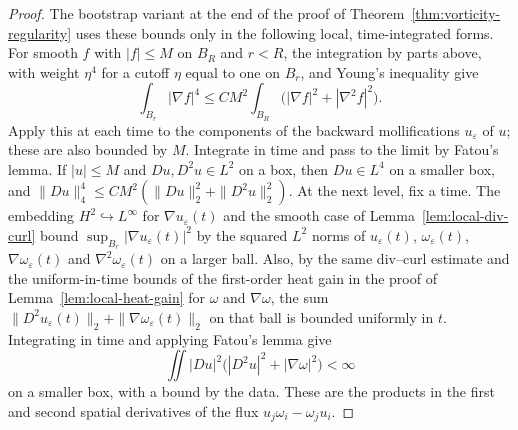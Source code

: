 \documentclass[11pt,letterpaper]{article}
\numberwithin{equation}{section}
\theoremstyle{plain}
\theoremstyle{definition}
\theoremstyle{remark}
\begin{document}
\begin{proof}
The bootstrap variant at the end of the proof of Theorem~\ref{thm:vorticity-regularity} uses these bounds only in the following local, time-integrated forms. For smooth $f$ with $|f|\le M$ on $B_R$ and $r<R$, the integration by parts above, with weight $\eta^4$ for a cutoff $\eta$ equal to one on $B_r$, and Young's inequality give
\[
 \int_{B_r}|\nabla f|^4\le CM^2\int_{B_R}\bigl(|\nabla f|^2+|\nabla^2f|^2\bigr).
\]
Apply this at each time to the components of the backward mollifications $u_\varepsilon$ of $u$; these are also bounded by $M$. Integrate in time and pass to the limit by Fatou's lemma. If $|u|\le M$ and $Du,D^2u\in L^2$ on a box, then $Du\in L^4$ on a smaller box, and $\|Du\|_4^4\le CM^2(\|Du\|_2^2+\|D^2u\|_2^2)$. At the next level, fix a time. The embedding $H^2\hookrightarrow L^\infty$ for $\nabla u_\varepsilon(t)$ and the smooth case of Lemma~\ref{lem:local-div-curl} bound $\sup_{B_r}|\nabla u_\varepsilon(t)|^2$ by the squared $L^2$ norms of $u_\varepsilon(t)$, $\omega_\varepsilon(t)$, $\nabla\omega_\varepsilon(t)$ and $\nabla^2\omega_\varepsilon(t)$ on a larger ball. Also, by the same div--curl estimate and the uniform-in-time bounds of the first-order heat gain in the proof of Lemma~\ref{lem:local-heat-gain} for $\omega$ and $\nabla\omega$, the sum $\|D^2u_\varepsilon(t)\|_2+\|\nabla\omega_\varepsilon(t)\|_2$ on that ball is bounded uniformly in $t$. Integrating in time and applying Fatou's lemma give
\[
 \iint|Du|^2\bigl(|D^2u|^2+|\nabla\omega|^2\bigr)<\infty
\]
on a smaller box, with a bound by the data. These are the products in the first and second spatial derivatives of the flux $u_j\omega_i-\omega_ju_i$.
\end{proof}
\end{document}
